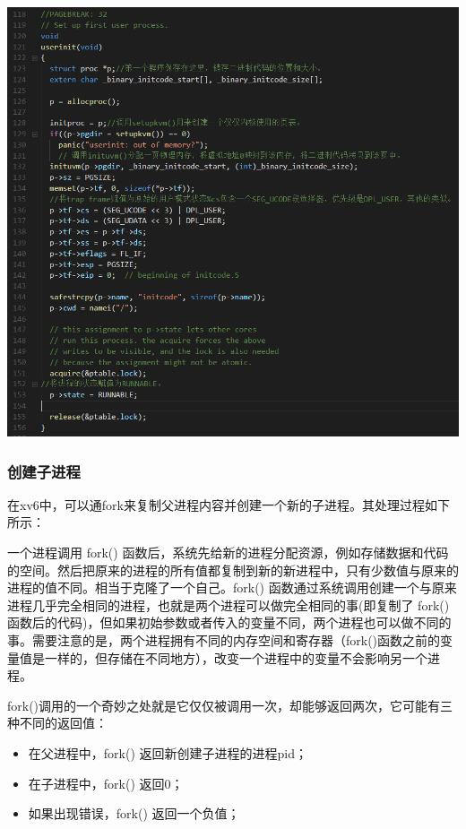 \includegraphics[width=6in]{figures/process/fig8.png}

\subsubsection{创建子进程}

在xv6中，可以通fork来复制父进程内容并创建一个新的子进程。其处理过程如下所示：

一个进程调用 fork() 函数后，系统先给新的进程分配资源，例如存储数据和代码的空间。然后把原来的进程的所有值都复制到新的新进程中，只有少数值与原来的进程的值不同。相当于克隆了一个自己。fork() 函数通过系统调用创建一个与原来进程几乎完全相同的进程，也就是两个进程可以做完全相同的事(即复制了 fork() 函数后的代码)，但如果初始参数或者传入的变量不同，两个进程也可以做不同的事。需要注意的是，两个进程拥有不同的内存空间和寄存器（fork()函数之前的变量值是一样的，但存储在不同地方），改变一个进程中的变量不会影响另一个进程。

fork()调用的一个奇妙之处就是它仅仅被调用一次，却能够返回两次，它可能有三种不同的返回值：

\begin{itemize}
\item 在父进程中，fork() 返回新创建子进程的进程pid；
\item 在子进程中，fork() 返回0；
\item 如果出现错误，fork() 返回一个负值；
\end{itemize}

